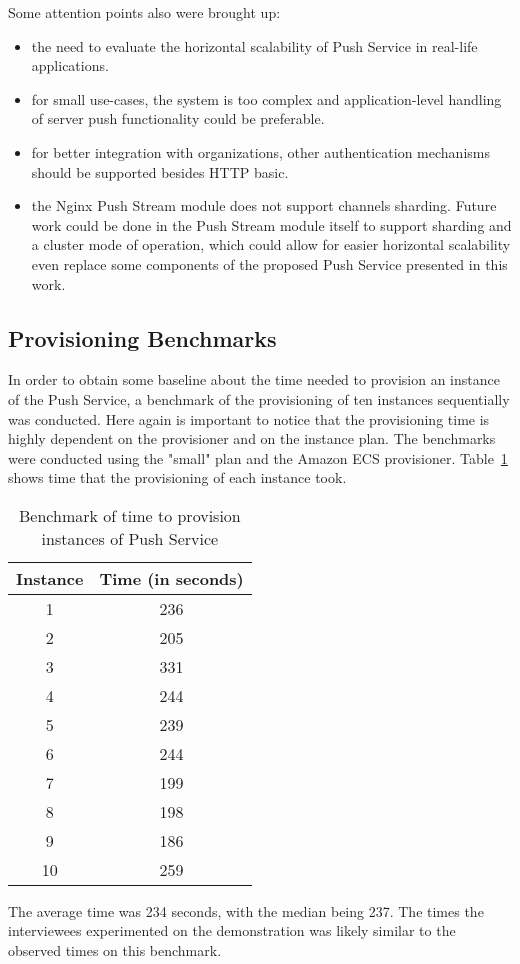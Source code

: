 Some attention points also were brought up:
\begin{itemize}
    \item the need to evaluate the horizontal scalability of Push Service in real-life applications.
    \item for small use-cases, the system is too complex and application-level handling of server push functionality could be preferable.
    \item for better integration with organizations, other authentication mechanisms should be supported besides HTTP basic.
    \item the Nginx Push Stream module does not support channels sharding. Future work could be done in the Push Stream module itself to support sharding and a cluster mode of operation, which could allow for easier horizontal scalability even replace some components of the proposed Push Service presented in this work.
\end{itemize}


\subsection{Provisioning Benchmarks}

In order to obtain some baseline about the time needed to provision an instance of the Push Service, a benchmark of the provisioning of ten instances sequentially was conducted. Here again is important to notice that the provisioning time is highly dependent on the provisioner and on the instance plan. The benchmarks were conducted using the "small" plan and the Amazon ECS provisioner. Table~\ref{table:result-benchmark} shows time that the provisioning of each instance took.

\begin{table}[h!]
    \centering
    \begin{tabular}{|c|c|}
        \hline
        Instance & Time (in seconds) \\
        \hline
        1 & 236 \\
        2 & 205 \\
        3 & 331 \\
        4 & 244 \\
        5 & 239 \\
        6 & 244 \\
        7 & 199 \\
        8 & 198 \\
        9 & 186 \\
        10 & 259 \\
        \hline
    \end{tabular}
    \caption{Benchmark of time to provision instances of Push Service}
    \label{table:result-benchmark}
\end{table}

The average time was 234 seconds, with the median being 237. The times the interviewees experimented on the demonstration was likely similar to the observed times on this benchmark.
